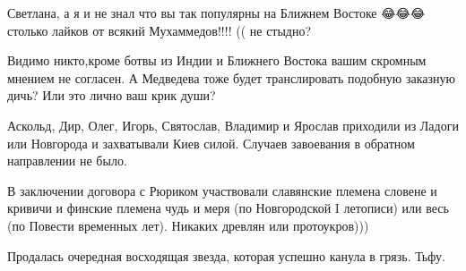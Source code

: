 \begin{itemize}
 
Светлана, а я и не знал что вы так популярны на Ближнем Востоке 😂😂😂столько лайков от всякий Мухаммедов!!!! (( не стыдно?

 
Видимо никто,кроме ботвы из Индии и Ближнего Востока вашим скромным мнением не согласен. А Медведева тоже будет транслировать подобную заказную дичь? Или это лично ваш крик души?

 
Аскольд, Дир, Олег, Игорь, Святослав, Владимир и Ярослав приходили из Ладоги
или Новгорода и захватывали Киев силой. Случаев завоевания в обратном
направлении не было.

 

В заключении договора с Рюриком участвовали славянские племена словене и
кривичи и финские племена чудь и меря (по Новгородской I летописи) или весь (по
Повести временных лет). Никаких древлян или протоукров)))


 
Продалась очередная восходящая звезда, которая успешно канула в грязь. Тьфу.

 


\end{itemize}
